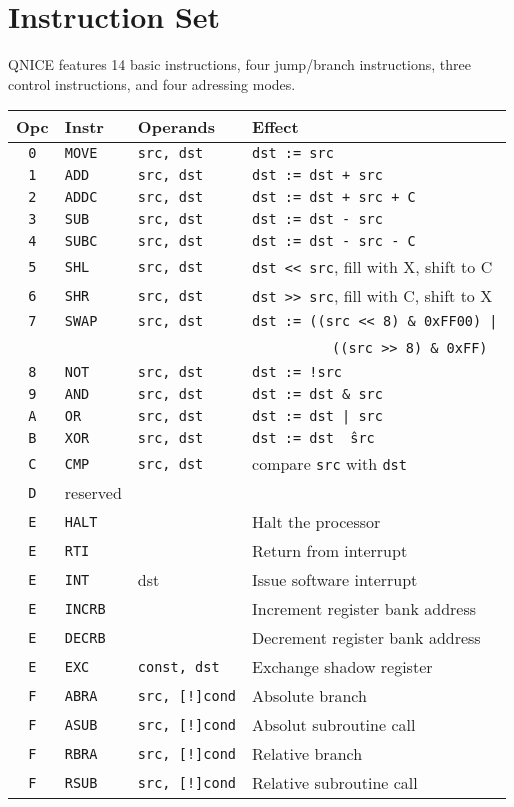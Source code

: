 \documentclass{leaflet}
\begin{document}
 \section{Instruction Set}
  QNICE features 14 basic instructions, four jump/branch instructions, three
  control instructions, and four adressing modes.
  \vspace*{-3mm}
  {\scriptsize
   \begin{center}
    \begin{longtable}{|c|ll|l|}
     \hline
      $\!\!\!$Opc$\!\!\!$&Instr&Operands&Effect\\
     \hline
     \hline
      {\tt 0}&{\tt MOVE}&{\tt src, dst}&{\tt dst := src}\\
      {\tt 1}&{\tt ADD}&{\tt src, dst}&{\tt dst := dst + src}\\
      {\tt 2}&{\tt ADDC}&{\tt src, dst}&{\tt dst := dst + src + C}\\
      {\tt 3}&{\tt SUB}&{\tt src, dst}&{\tt dst := dst - src}\\
      {\tt 4}&{\tt SUBC}&{\tt src, dst}&{\tt dst := dst - src - C}\\
      {\tt 5}&{\tt SHL}&{\tt src, dst}&{\tt dst << src}, fill with X, shift to C\\
      {\tt 6}&{\tt SHR}&{\tt src, dst}&{\tt dst >> src}, fill with C, shift to X\\
      {\tt 7}&{\tt SWAP}&{\tt src, dst}&{\tt dst := ((src << 8) \& 0xFF00) |}\\
             &          &              &~~~~~~~~~~{\tt ((src >> 8) \& 0xFF)}\\
      {\tt 8}&{\tt NOT}&{\tt src, dst}&{\tt dst := !src}\\
      {\tt 9}&{\tt AND}&{\tt src, dst}&{\tt dst := dst \& src}\\
      {\tt A}&{\tt OR}&{\tt src, dst}&{\tt dst := dst | src}\\
      {\tt B}&{\tt XOR}&{\tt src, dst}&{\tt dst := dst \^\ src}\\
      {\tt C}&{\tt CMP}&{\tt src, dst}&compare {\tt src} with {\tt dst}\\
      {\tt D}&reserved&&\\
      {\tt E}&{\tt HALT}&&Halt the processor\\
      {\tt E}&{\tt RTI}&&Return from interrupt\\
      {\tt E}&{\tt INT}&dst&Issue software interrupt\\
      {\tt E}&{\tt INCRB}&&Increment register bank address\\
      {\tt E}&{\tt DECRB}&&Decrement register bank address\\
      {\tt E}&{\tt EXC}&{\tt const, dst}&Exchange shadow register\\
      {\tt F}&{\tt ABRA}&{\tt src, [!]cond}&Absolute branch\\
      {\tt F}&{\tt ASUB}&{\tt src, [!]cond}&Absolut subroutine call\\
      {\tt F}&{\tt RBRA}&{\tt src, [!]cond}&Relative branch\\
      {\tt F}&{\tt RSUB}&{\tt src, [!]cond}&Relative subroutine call\\
     \hline
    \end{longtable}
   \end{center}
  }
\end{document}

